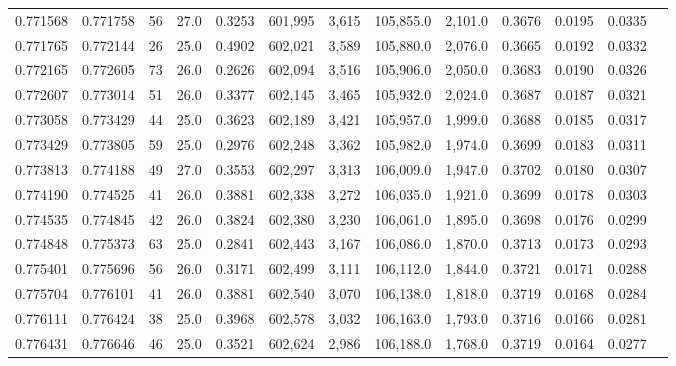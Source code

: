 \begin{tabular}{rrrrrrrrrrrrr}
0.771568 & 0.771758 &    56 & 27.0 &                                     0.3253 & 601,995 &   3,615 & 105,855.0 &   2,101.0 & 0.3676 & 0.0195 & 0.0335 \\
0.771765 & 0.772144 &    26 & 25.0 &                                     0.4902 & 602,021 &   3,589 & 105,880.0 &   2,076.0 & 0.3665 & 0.0192 & 0.0332 \\
0.772165 & 0.772605 &    73 & 26.0 &                                     0.2626 & 602,094 &   3,516 & 105,906.0 &   2,050.0 & 0.3683 & 0.0190 & 0.0326 \\
0.772607 & 0.773014 &    51 & 26.0 &                                     0.3377 & 602,145 &   3,465 & 105,932.0 &   2,024.0 & 0.3687 & 0.0187 & 0.0321 \\
0.773058 & 0.773429 &    44 & 25.0 &                                     0.3623 & 602,189 &   3,421 & 105,957.0 &   1,999.0 & 0.3688 & 0.0185 & 0.0317 \\
0.773429 & 0.773805 &    59 & 25.0 &                                     0.2976 & 602,248 &   3,362 & 105,982.0 &   1,974.0 & 0.3699 & 0.0183 & 0.0311 \\
0.773813 & 0.774188 &    49 & 27.0 &                                     0.3553 & 602,297 &   3,313 & 106,009.0 &   1,947.0 & 0.3702 & 0.0180 & 0.0307 \\
0.774190 & 0.774525 &    41 & 26.0 &                                     0.3881 & 602,338 &   3,272 & 106,035.0 &   1,921.0 & 0.3699 & 0.0178 & 0.0303 \\
0.774535 & 0.774845 &    42 & 26.0 &                                     0.3824 & 602,380 &   3,230 & 106,061.0 &   1,895.0 & 0.3698 & 0.0176 & 0.0299 \\
0.774848 & 0.775373 &    63 & 25.0 &                                     0.2841 & 602,443 &   3,167 & 106,086.0 &   1,870.0 & 0.3713 & 0.0173 & 0.0293 \\
0.775401 & 0.775696 &    56 & 26.0 &                                     0.3171 & 602,499 &   3,111 & 106,112.0 &   1,844.0 & 0.3721 & 0.0171 & 0.0288 \\
0.775704 & 0.776101 &    41 & 26.0 &                                     0.3881 & 602,540 &   3,070 & 106,138.0 &   1,818.0 & 0.3719 & 0.0168 & 0.0284 \\
0.776111 & 0.776424 &    38 & 25.0 &                                     0.3968 & 602,578 &   3,032 & 106,163.0 &   1,793.0 & 0.3716 & 0.0166 & 0.0281 \\
0.776431 & 0.776646 &    46 & 25.0 &                                     0.3521 & 602,624 &   2,986 & 106,188.0 &   1,768.0 & 0.3719 & 0.0164 & 0.0277 \\

\end{tabular}
